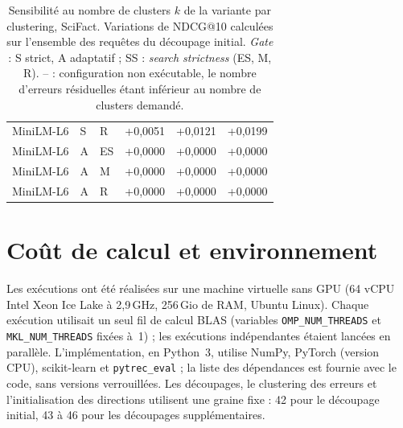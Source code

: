\documentclass[a4paper,10pt]{article}
\begin{document}
\begin{table}[p]
\begin{tabular}{lllrrr}
MiniLM-L6 & S & R & +0,0051 & +0,0121 & +0,0199 \\
MiniLM-L6 & A & ES & +0,0000 & +0,0000 & +0,0000 \\
MiniLM-L6 & A & M & +0,0000 & +0,0000 & +0,0000 \\
MiniLM-L6 & A & R & +0,0000 & +0,0000 & +0,0000 \\
\bottomrule
\end{tabular}
\caption{Sensibilité au nombre de clusters $k$ de la variante par clustering, SciFact. Variations de NDCG@10 calculées sur l'ensemble des requêtes du découpage initial. \textit{Gate} : S strict, A adaptatif ; SS : \textit{search strictness} (ES, M, R). -- : configuration non exécutable, le nombre d'erreurs résiduelles étant inférieur au nombre de clusters demandé.}
\label{tab:s-clusters-scifact}
\end{table}


\section{Coût de calcul et environnement}

Les exécutions ont été réalisées sur une machine virtuelle sans GPU (64 vCPU Intel Xeon Ice Lake à 2,9\,GHz, 256\,Gio de RAM, Ubuntu Linux). Chaque exécution utilisait un seul fil de calcul BLAS (variables \texttt{OMP\_NUM\_THREADS} et \texttt{MKL\_NUM\_THREADS} fixées à~1) ; les exécutions indépendantes étaient lancées en parallèle. L'implémentation, en Python~3, utilise NumPy, PyTorch (version CPU), scikit-learn et \texttt{pytrec\_eval} ; la liste des dépendances est fournie avec le code, sans versions verrouillées. Les découpages, le clustering des erreurs et l'initialisation des directions utilisent une graine fixe : 42 pour le découpage initial, 43 à 46 pour les découpages supplémentaires.
\end{document}
